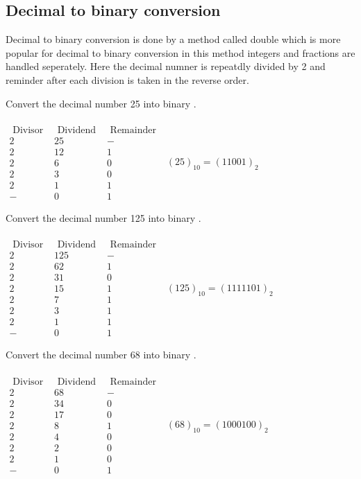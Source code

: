 \subsection{Decimal to binary conversion}
Decimal to binary conversion is done by a method called double which is more popular for decimal to binary conversion in this method integers and fractions are handled seperately. Here the decimal numner is repeatdly divided by 2 and reminder after each division is taken in the reverse order. 
\begin{exercise}
	Convert the decimal number 25 into binary .\\\\
	$\begin{array}{ccc}\text { Divisor } & \text { Dividend } & \text { Remainder } \\  2 & 25 & - \\ 2 & 12 & 1 \\ 2 & 6 & 0 \\ 2 & 3 & 0 \\ 2 & 1 & 1  \\ - & 0 & 1\end{array}$\qquad
	$(25)_{10}=(11001)_{2}$
\end{exercise}

\begin{exercise}
	Convert the decimal number 125 into binary .\\\\
	$\begin{array}{ccc}\text { Divisor } & \text { Dividend } & \text { Remainder } \\  2 & 125 & - \\ 2 & 62 & 1 \\ 2 &31& 0 \\ 2 & 15 & 1 \\ 2 & 7 & 1  \\ 2 & 3 & 1 \\ 2 & 1 & 1 \\ - & 0 & 1\end{array}$\qquad
	$(125)_{10}=(1111101)_{2}$
\end{exercise}
\begin{exercise}
	Convert the decimal number 68 into binary .\\\\
	$\begin{array}{ccc}\text { Divisor } & \text { Dividend } & \text { Remainder } \\  2 & 68 & - \\ 2 & 34 & 0 \\ 2 & 17 & 0 \\ 2 & 8 & 1 \\ 2 & 4 & 0  \\ 2 & 2 & 0 \\ 2 & 1 & 0 \\ - & 0 & 1\end{array}$\qquad
	$(68)_{10}=(1000100)_{2}$
\end{exercise}

